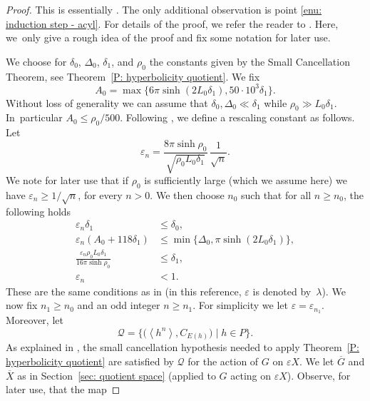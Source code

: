 \documentclass[JEP,XML,SOM,Unicode, NoEqCountersInSection,published]{cedram}
\let\mathcal\mathscr
\theoremstyle{plain}
\theoremstyle{definition}
\newcommand{\q}[1]{\overline{#1}}
\begin{document}
\begin{proof}
This is essentially \cite[Prop.\,7.1]{coulon_geometry_2014}. The only additional observation is point \eqref{enu: induction step - acyl}. For details of the proof, we refer the reader to \cite{coulon_geometry_2014}.
Here, we~only give a rough idea of the proof and fix some notation for later use.

We choose for $\delta_0$, $\Delta_0$, $\delta_1$, and $\rho_0$ the constants given by the Small Cancellation Theorem, see Theorem~\ref{P: hyperbolicity quotient}.
We fix
\begin{equation*}
A_0 = \max\{6\pi \sinh(2L_0\delta_1), 50\cdot 10^3\delta_1\}.
\end{equation*}
Without loss of generality we can assume that $\delta_0, \Delta_0 \ll \delta_1$ while $\rho_0 \gg L_0\delta_1$.
In~particular $A_0 \leq \rho_0/500$.
Following \cite[pp.\,319]{coulon_geometry_2014}, we define a rescaling constant as follows. Let
\[
\varepsilon_n= \frac{8 \pi \sinh \rho_0 }{\sqrt{\rho_0 L_0 \delta_1}}\, \frac{1}{\sqrt{n}}.
\]
We note for later use that if $\rho_0$ is sufficiently large (which we assume here) we have $\varepsilon_n \geq 1/\sqrt n$, for every $n > 0$.
We then choose $n_0$ such that for all $n \geq n_0$, the following holds
\begin{align}
\varepsilon_n \delta_1 & \leq \delta_0, \\
\label{eqn: def epsilon}
\varepsilon_n (A_0 + 118\delta_1) & \leq \min\{ \Delta_0, \pi \sinh(2 L_0\delta_1)\}, \\
\frac{\varepsilon_n \rho_0L_0 \delta_1}{16 \pi \sinh \rho_0} & \leq \delta_1,\\
\varepsilon_n &< 1.
\end{align}
These are the same conditions as in \cite[p.\,319]{coulon_geometry_2014} (in this reference, $\varepsilon$ is denoted by~$\lambda$).
We now fix $n_1 \geq n_0$ and an odd integer $n \geq n_1$.
For simplicity we let $\varepsilon = \varepsilon_{n_1}$.
Moreover, let
\begin{equation*}
\mathcal Q=\bigl\{\bigl(\left<h^n\right>,C_{E(h)} \bigr)\mid h\in P \bigr\}.
\end{equation*}
As explained in \cite[Lem.\,7.2]{coulon_geometry_2014}, the small cancellation hypothesis needed to apply Theorem~\ref{P: hyperbolicity quotient} are satisfied by $\mathcal Q$ for the action of $G$ on $\varepsilon X$.
We let $\q G$ and $\q {X}$ as in Section~\ref{sec: quotient space} (applied to $G$ acting on $\varepsilon X$).
Observe, for later use, that the map

\end{proof}
\end{document}
